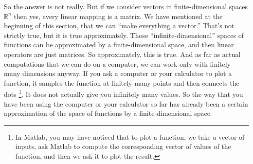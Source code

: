 \documentclass{ximera}
\begin{document}
So the answer is not really.  But if we consider vectors in finite-dimensional spaces ${\mathbb R}^n$ then yes, every linear mapping is a matrix. We have mentioned at the beginning of this section, that we can ``make everything a vector.''  That's not strictly true, but it is true approximately.  Those ``infinite-dimensional'' spaces of functions can be approximated by a finite-dimensional space, and then linear operators are just matrices.  So approximately, this is true.  And as far as actual computations that we can do on a computer, we can work only with finitely many dimensions anyway.  If you ask a computer or your calculator to plot a function, it samples the function at finitely many points and then connects the dots 
\footnote{In Matlab, you may have noticed that to plot a function, we take a vector of inputs, ask Matlab to compute the corresponding vector of values of the function, and then we ask it to plot the result.}.
It does not actually give you infinitely many values. So the way that you have been using the computer or your calculator so far has already been a certain approximation of the space of functions by a finite-dimensional space. 
\end{document}
